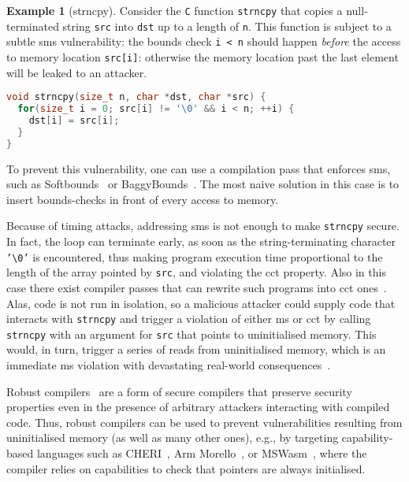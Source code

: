 \documentclass[dvipsnames,conference]{IEEEtran}
\theoremstyle{definition}
\newtheorem{exampleenv}{Example}[section]
\begin{document}
\begin{exampleenv}[strncpy]\label{ex:strncpy}
Consider the \texttt{C} function \texttt{strncpy} that copies a null-terminated string \texttt{src} into \texttt{dst} up to a length of \texttt{n}.
This function is subject to a subtle \gls*{sms} vulnerability: the bounds check \texttt{i < n} should happen {\it before} the access to memory location \texttt{src[i]}: otherwise
the memory location past the last element will be leaked to an attacker.
\begin{lstlisting}[language=c,basicstyle=\small\ttfamily,morekeywords={size_t}]
void strncpy(size_t n, char *dst, char *src) {
  for(size_t i = 0; src[i] != '\0' && i < n; ++i) {
    dst[i] = src[i];
  }
}
\end{lstlisting}

To prevent this vulnerability, one can use a compilation pass that enforces \gls*{sms}, such as Softbounds~\cite{nagarakatte2009soft} or BaggyBounds~\cite{akritidis2009baggy}.
The most naive solution in this case is to insert bounds-checks in front of every access to memory.

Because of timing attacks, addressing \gls*{sms} is not enough to make \texttt{strncpy} secure.
In fact, the loop can terminate early, as soon as the string-terminating character \texttt{'\textbackslash 0'} is encountered, thus making program execution time proportional to the length of the array pointed by \texttt{src}, and violating the \gls*{cct} property.
Also in this case there exist compiler passes that can rewrite such programs into \gls*{cct} ones~\cite{cauligi2019fact}.
%
Alas, code is not run in isolation, so a malicious attacker could supply code that interacts with \texttt{strncpy} and trigger a violation of either \gls*{ms} or \gls*{cct} by calling \texttt{strncpy} with an argument for \texttt{src} that points to uninitialised memory.
This would, in turn, trigger a series of reads from uninitialised memory, which is an immediate \gls*{ms} violation with devastating real-world consequences~\cite{uninit-0,uninit-1,uninit-2,uninit-3,uninit-4}.

Robust compilers~\cite{abate2019jour} are a form of secure compilers that preserve security properties even in the presence of arbitrary attackers interacting with compiled code.
Thus, robust compilers can be used to prevent vulnerabilities resulting from uninitialised memory (as well as many other ones), e.g., by targeting capability-based languages such as CHERI~\cite{woodruff2014CHERI}, Arm Morello~\cite{arm-morello}, or MSWasm~\cite{michael2023mswasm}, where the compiler relies on capabilities to check that pointers are always initialised.
\end{exampleenv}
\end{document}
